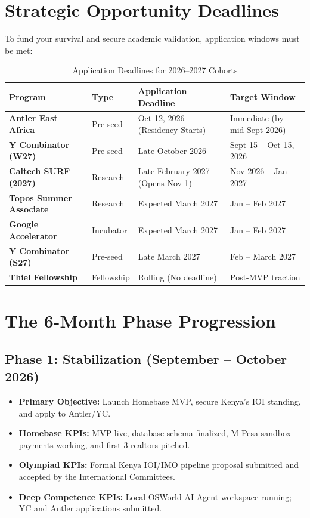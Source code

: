 \documentclass[11pt,a4paper]{article}
\begin{document}
\newpage
\section{Strategic Opportunity Deadlines}
To fund your survival and secure academic validation, application windows must be met:
\begin{table}[h]
\centering
\begin{tabularx}{\textwidth}{l|l|l|X}
\toprule
\textbf{Program} & \textbf{Type} & \textbf{Application Deadline} & \textbf{Target Window} \\
\midrule
\textbf{Antler East Africa} & Pre-seed & Oct 12, 2026 (Residency Starts) & Immediate (by mid-Sept 2026) \\
\textbf{Y Combinator (W27)} & Pre-seed & Late October 2026 & Sept 15 -- Oct 15, 2026 \\
\textbf{Caltech SURF (2027)} & Research & Late February 2027 (Opens Nov 1) & Nov 2026 -- Jan 2027 \\
\textbf{Topos Summer Associate} & Research & Expected March 2027 & Jan -- Feb 2027 \\
\textbf{Google Accelerator} & Incubator & Expected March 2027 & Jan -- Feb 2027 \\
\textbf{Y Combinator (S27)} & Pre-seed & Late March 2027 & Feb -- March 2027 \\
\textbf{Thiel Fellowship} & Fellowship & Rolling (No deadline) & Post-MVP traction \\
\bottomrule
\end{tabularx}
\caption{Application Deadlines for 2026--2027 Cohorts}
\end{table}

\section{The 6-Month Phase Progression}

\subsection{Phase 1: Stabilization (September -- October 2026)}
\begin{itemize}
    \item \textbf{Primary Objective:} Launch Homebase MVP, secure Kenya's IOI standing, and apply to Antler/YC.
    \item \textbf{Homebase KPIs:} MVP live, database schema finalized, M-Pesa sandbox payments working, and first 3 realtors pitched.
    \item \textbf{Olympiad KPIs:} Formal Kenya IOI/IMO pipeline proposal submitted and accepted by the International Committees.
    \item \textbf{Deep Competence KPIs:} Local OSWorld AI Agent workspace running; YC and Antler applications submitted.
\end{itemize}
\end{document}
